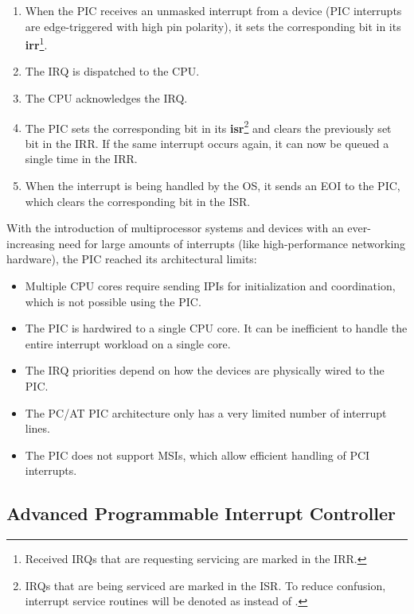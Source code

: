 \begin{enumerate}
  \item When the PIC receives an unmasked interrupt from a device (PIC interrupts are edge-triggered with high pin polarity), it sets the corresponding bit in its \textbf{\gls{irr}}\footnote{
          Received IRQs that are requesting servicing are marked in the IRR.}.
  \item The IRQ is dispatched to the CPU\@.
  \item The CPU acknowledges the IRQ\@.
  \item The PIC sets the corresponding bit in its \textbf{\gls{isr}}\footnote{
          IRQs that are being serviced are marked in the ISR\@.
          To reduce confusion, interrupt service routines will be denoted as  instead of .}
        and clears the previously set bit in the IRR\@.
        If the same interrupt occurs again, it can now be queued a single time in the IRR\@.
  \item When the interrupt is being handled by the OS, it sends an EOI to the PIC, which clears the corresponding bit in the ISR\@.
\end{enumerate}

With the introduction of multiprocessor systems and devices with an ever-increasing need for large amounts of interrupts (like high-performance networking hardware), the PIC reached its architectural limits:

\begin{itemize}
  \item Multiple CPU cores require sending IPIs for initialization and coordination, which is not possible using the PIC\@.
  \item The PIC is hardwired to a single CPU core.
        It can be inefficient to handle the entire interrupt workload on a single core.
  \item The IRQ priorities depend on how the devices are physically wired to the PIC\@.
  \item The PC/AT PIC architecture only has a very limited number of interrupt lines.
  \item The PIC does not support MSIs, which allow efficient handling of PCI interrupts.
\end{itemize}

\subsection{Advanced Programmable Interrupt Controller}
\label{subsec:intelapic}

